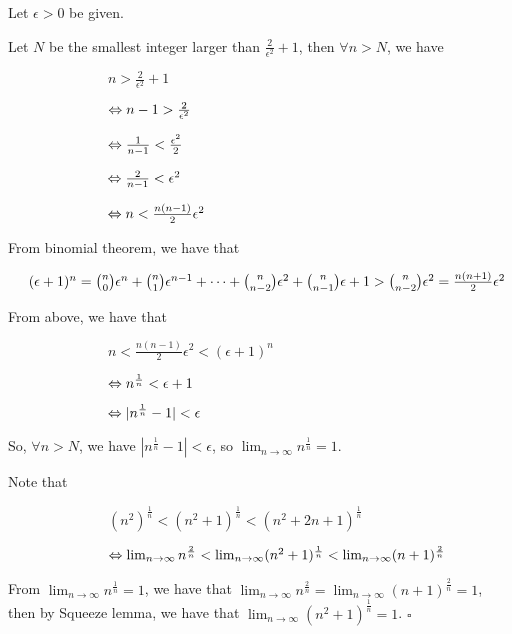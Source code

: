 \documentclass{article}
\begin{document}
Let $\epsilon > 0$ be given. 

Let $N$ be the smallest integer larger than $\frac{2}{\epsilon^2}+1$, then $\forall n > N$, we have

$\hspace{3cm} n > \frac{2}{\epsilon^2}+1$

$\hspace{2.5cm} \Leftrightarrow n-1 > \frac{2}{\epsilon^2}$

$\hspace{2.5cm} \Leftrightarrow \frac{1}{n-1} < \frac{\epsilon^2}{2}$

$\hspace{2.5cm} \Leftrightarrow \frac{2}{n-1} < \epsilon^2$

$\hspace{2.5cm} \Leftrightarrow n < \frac{n(n-1)}{2}\epsilon^2$

From binomial theorem, we have that

$\hspace{.5cm} (\epsilon +1)^n = {n\choose 0}\epsilon^n + {n\choose 1}\epsilon^{n-1} + \dots + {n\choose n-2}\epsilon^2 + {n\choose n-1}\epsilon + 1 >{n\choose n-2}\epsilon^2 = \frac{n(n+1)}{2}\epsilon^2$

From above, we have that

$\hspace{3cm} n < \frac{n(n-1)}{2}\epsilon^2 < (\epsilon+1)^n$

$\hspace{2.5cm} \Leftrightarrow n^{\frac{1}{n}} < \epsilon+1$

$\hspace{2.5cm} \Leftrightarrow |n^{\frac{1}{n}} - 1| < \epsilon$

So,  $\forall n > N$, we have $|n^{\frac{1}{n}} - 1| < \epsilon$,  so $\lim_{n\rightarrow\infty}n^{\frac{1}{n}} =1 $.

Note that 

$\hspace{3cm} (n^2)^{\frac{1}{n}}<(n^2+1)^{\frac{1}{n}} < (n^2+2n+1)^{\frac{1}{n}}$


$\hspace{2.5cm} \Leftrightarrow \lim_{n\rightarrow \infty}n^{\frac{2}{n}}<\lim_{n\rightarrow \infty}(n^2+1)^{\frac{1}{n}} < \lim_{n\rightarrow \infty}(n+1)^{\frac{2}{n}}$


From $\lim_{n\rightarrow\infty}n^{\frac{1}{n}} =1$, we have that  $\lim_{n\rightarrow \infty}n^{\frac{2}{n}}=\lim_{n\rightarrow \infty}(n+1)^{\frac{2}{n}} =1$, then by Squeeze lemma, we have that $\lim_{n\rightarrow \infty}(n^2+1)^{\frac{1}{n}}=1$. $\square$
\end{document}
